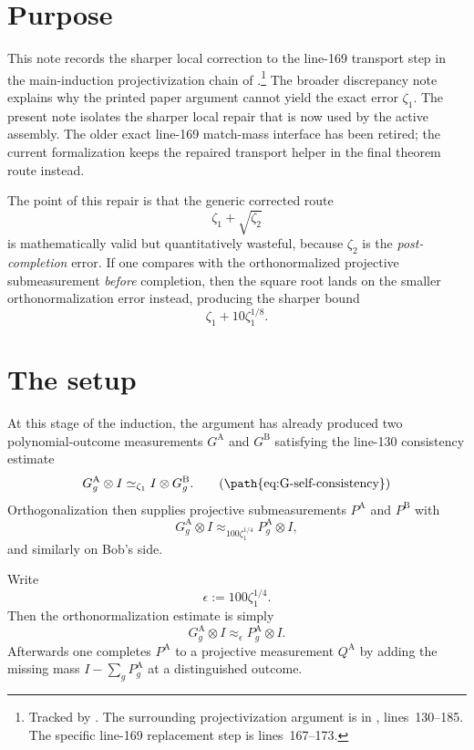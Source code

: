 \documentclass[11pt]{article}
\begin{document}
\section{Purpose}

This note records the sharper local correction to the line-169 transport step in
the main-induction projectivization chain of
\cite{Ji2020LowIndividualDegree}.\footnote{Tracked by . The
surrounding projectivization argument is in
, lines~130--185. The specific
line-169 replacement step is lines~167--173.}
The broader discrepancy note
 explains why the printed paper
argument cannot yield the exact error $\zeta_1$. The present note isolates the
sharper local repair that is now used by the active
 assembly.  The older exact line-169
match-mass interface has been retired; the current formalization keeps the
repaired transport helper in the final theorem route instead.

The point of this repair is that the generic corrected route
\[
  \zeta_1 + \sqrt{\zeta_2}
\]
is mathematically valid but quantitatively wasteful, because $\zeta_2$ is the
\emph{post-completion} error.  If one compares with the orthonormalized
projective submeasurement \emph{before} completion, then the square root lands
on the smaller orthonormalization error instead, producing the sharper bound
\[
  \zeta_1 + 10\zeta_1^{1/8}.
\]

\section{The setup}

At this stage of the induction, the argument has already produced two
polynomial-outcome measurements $G^{\mathrm A}$ and $G^{\mathrm B}$ satisfying
the line-130 consistency estimate
\[
  G^{\mathrm A}_g \otimes I \simeq_{\zeta_1} I \otimes G^{\mathrm B}_g.
  \tag{\path{eq:G-self-consistency}}
\]
Orthogonalization then supplies projective submeasurements
$P^{\mathrm A}$ and $P^{\mathrm B}$ with
\[
  G^{\mathrm A}_g \otimes I
  \approx_{100\zeta_1^{1/4}}
  P^{\mathrm A}_g \otimes I,
\]
and similarly on Bob's side.

Write
\[
  \epsilon := 100\zeta_1^{1/4}.
\]
Then the orthonormalization estimate is simply
\[
  G^{\mathrm A}_g \otimes I \approx_{\epsilon} P^{\mathrm A}_g \otimes I.
\]
Afterwards one completes $P^{\mathrm A}$ to a projective measurement
$Q^{\mathrm A}$ by adding the missing mass $I-\sum_g P^{\mathrm A}_g$ at a
distinguished outcome.
\end{document}
